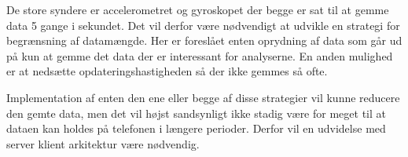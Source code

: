 De store syndere er accelerometret og gyroskopet der begge er sat til at gemme data 5 gange i sekundet.
Det vil derfor være nødvendigt at udvikle en strategi for begrænsning af datamængde.
Her er foreslået enten oprydning af data som går ud på kun at gemme det data der er interessant for analyserne.
En anden mulighed er at nedsætte opdateringshastigheden så der ikke gemmes så ofte.

Implementation af enten den ene eller begge af disse strategier vil kunne reducere den gemte data, men det vil højst sandsynligt ikke stadig være for meget til at dataen kan holdes på telefonen i længere perioder.
Derfor vil en udvidelse med server klient arkitektur være nødvendig.
